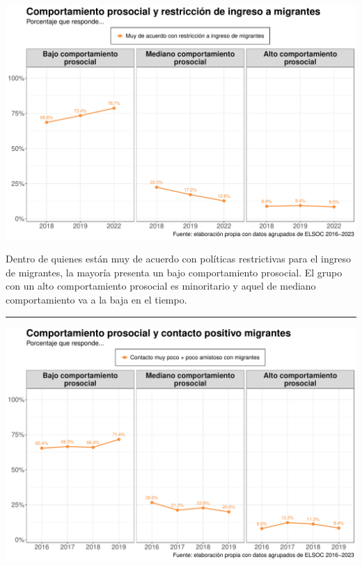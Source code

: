 \documentclass[
  spanish,
  letterpaper,
  DIV=11,
  numbers=noendperiod,
  oneside]{scrartcl}
\begin{document}
\begin{center}
\includegraphics[width=1\linewidth,height=\textheight,keepaspectratio]{cep_2025_files/figure-pdf/unnamed-chunk-10-1.pdf}
\end{center}

Dentro de quienes están muy de acuerdo con políticas restrictivas para
el ingreso de migrantes, la mayoría presenta un bajo comportamiento
prosocial. El grupo con un alto comportamiento prosocial es minoritario
y aquel de mediano comportamiento va a la baja en el tiempo.

\begin{center}\rule{0.5\linewidth}{0.5pt}\end{center}

\begin{center}
\includegraphics[width=1\linewidth,height=\textheight,keepaspectratio]{cep_2025_files/figure-pdf/unnamed-chunk-11-1.pdf}
\end{center}
\end{document}
